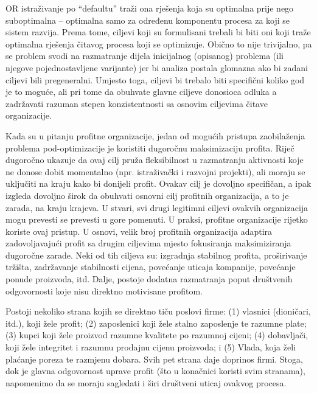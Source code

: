 \documentclass[a4paper, utf8, 11pt, colorlinks]{article}
\begin{document}
OR istraživanje po ``defaultu'' traži ona rješenja koja su optimalna prije nego suboptimalna -- optimalna samo za određenu komponentu procesa za koji se sistem razvija. Prema tome, ciljevi koji su formulisani trebali bi biti oni koji traže optimalna rješenja čitavog procesa koji se optimizuje.  Obično to nije trivijalno, pa se problem svodi na razmatranje dijela inicijalnog (opisanog) problema (ili njegove pojednostavljene varijante) jer bi analiza postala glomazna ako bi zadani ciljevi bili pregeneralni. Umjesto toga, ciljevi bi trebalo biti specifični 
koliko god je to moguće, ali pri tome da obuhvate glavne ciljeve donosioca odluka a zadržavati razuman stepen konzistentnosti sa osnovim ciljevima čitave organizacije. 

Kada su u pitanju profitne organizacije, jedan od mogućih pristupa zaobilaženja problema pod-optimizacije je koristiti dugoročnu maksimizaciju profita. Riječ dugoročno ukazuje da ovaj cilj pruža fleksibilnost u razmatranju aktivnosti koje ne donose dobit momentalno 
(npr. istraživački i razvojni projekti), ali moraju se uključiti na kraju kako bi donijeli profit. Ovakav cilj je   dovoljno specifičan, a ipak izgleda dovoljno širok da obuhvati osnovni cilj profitnih organizacija, a to je zarada, na kraju krajeva. U stvari, svi drugi legitimni ciljevi ovakvih organizacija mogu prevesti se prevesti u gore pomenuti. U praksi, profitne organizacije rijetko koriste ovaj pristup. U osnovi, velik broj profitnih organizacija adaptira zadovoljavajući profit sa drugim ciljevima mjesto fokusiranja maksimiziranja dugoročne zarade. Neki od tih ciljeva su: izgradnja stabilnog profita, proširivanje tržišta, zadržavanje stabilnosti cijena, povećanje uticaja kompanije, povećanje ponude proizvoda, itd. 
Dalje, postoje dodatna razmatranja poput društvenih odgovornosti koje nisu direktno motivisane profitom.  

Postoji nekoliko strana kojih se direktno tiču poslovi firme: (1) vlasnici (dioničari, itd.), koji žele profit;   (2) zaposlenici koji žele stalno zaposlenje te razumne plate; (3) kupci koji žele proizvod razumne kvalitete po razumnoj cijeni;
(4) dobavljači, koji žele integritet i razumnu prodajnu cijenu proizvoda; i
(5) Vlada, koja želi plaćanje poreza te razmjenu dobara. Svih pet strana daje doprinos firmi. Stoga, dok je glavna odgovornost uprave profit (što u konačnici koristi svim stranama), napomenimo da se moraju sagledati i širi društveni uticaj ovakvog procesa. 
 
\end{document}
